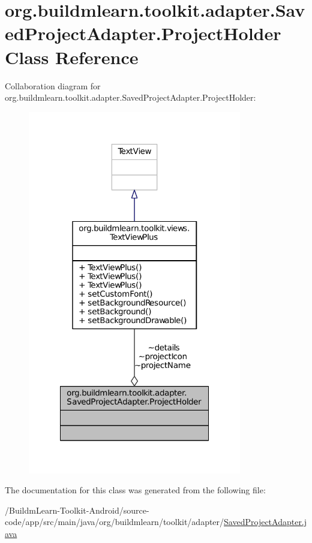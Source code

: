 \hypertarget{classorg_1_1buildmlearn_1_1toolkit_1_1adapter_1_1SavedProjectAdapter_1_1ProjectHolder}{\section{org.\-buildmlearn.\-toolkit.\-adapter.\-Saved\-Project\-Adapter.\-Project\-Holder Class Reference}
\label{classorg_1_1buildmlearn_1_1toolkit_1_1adapter_1_1SavedProjectAdapter_1_1ProjectHolder}
}


Collaboration diagram for org.\-buildmlearn.\-toolkit.\-adapter.\-Saved\-Project\-Adapter.\-Project\-Holder\-:
\nopagebreak
\begin{figure}[H]
\begin{center}
\leavevmode
\includegraphics[width=264pt]{db/dfe/classorg_1_1buildmlearn_1_1toolkit_1_1adapter_1_1SavedProjectAdapter_1_1ProjectHolder__coll__graph}
\end{center}
\end{figure}


The documentation for this class was generated from the following file\-:\begin{DoxyCompactItemize}
\item 
/\-Buildm\-Learn-\/\-Toolkit-\/\-Android/source-\/code/app/src/main/java/org/buildmlearn/toolkit/adapter/\hyperlink{SavedProjectAdapter_8java}{Saved\-Project\-Adapter.\-java}\end{DoxyCompactItemize}
